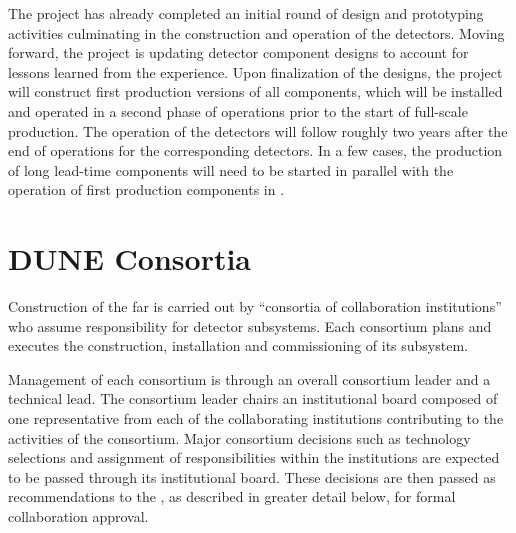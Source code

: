 The  project has already completed an initial round of design 
and prototyping activities culminating in the construction and operation 
of the  detectors.  Moving forward, the project is 
updating detector component designs to account for lessons learned from 
the  experience.  Upon finalization of the designs, the 
project will construct first production versions of all components, which 
will be installed and operated in a second phase of  
operations prior to the start of full-scale production.  The operation 
of the  detectors will follow roughly two years after
the end of operations for the corresponding  detectors.
In a few cases, the production of long lead-time components will need to 
be started in parallel with the operation of first production components 
in .

\section{DUNE Consortia}
\label{sec:consortia}

Construction of the  far  is carried out by 
``consortia of collaboration institutions'' who assume responsibility for 
detector subsystems.  Each consortium plans and executes the construction, 
installation and commissioning of its subsystem.

Management of each consortium is through an overall consortium leader and  
a technical lead.  The consortium leader chairs an institutional board 
composed of one representative from each of the collaborating institutions 
contributing to the activities of the consortium.  Major consortium decisions 
such as technology selections and assignment of responsibilities within 
the institutions are expected to be passed through its institutional board.  
These decisions are then passed as recommendations to the  
, as described in greater detail below, for formal collaboration 
approval.

